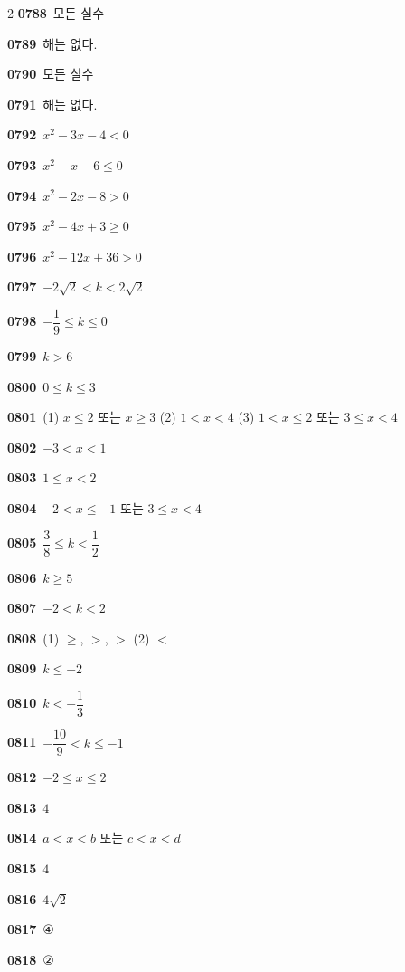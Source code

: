 \documentclass[10pt,a4paper]{article}
\begin{document}
\begin{multicols}{2}
\noindent\textbf{0788}\ 모든 실수\par
\noindent\textbf{0789}\ 해는 없다.\par
\noindent\textbf{0790}\ 모든 실수\par
\noindent\textbf{0791}\ 해는 없다.\par
\noindent\textbf{0792}\ $x^2-3x-4<0$\par
\noindent\textbf{0793}\ $x^2-x-6\le 0$\par
\noindent\textbf{0794}\ $x^2-2x-8>0$\par
\noindent\textbf{0795}\ $x^2-4x+3\ge 0$\par
\noindent\textbf{0796}\ $x^2-12x+36>0$\par
\noindent\textbf{0797}\ $-2\sqrt{2}<k<2\sqrt{2}$\par
\noindent\textbf{0798}\ $-\dfrac{1}{9}\le k\le 0$\par
\noindent\textbf{0799}\ $k>6$\par
\noindent\textbf{0800}\ $0\le k\le 3$\par
\noindent\textbf{0801}\ (1) $x\le 2$ 또는 $x\ge 3$ \quad (2) $1<x<4$ \quad (3) $1<x\le 2$ 또는 $3\le x<4$\par
\noindent\textbf{0802}\ $-3<x<1$\par
\noindent\textbf{0803}\ $1\le x<2$\par
\noindent\textbf{0804}\ $-2<x\le -1$ 또는 $3\le x<4$\par
\noindent\textbf{0805}\ $\dfrac{3}{8}\le k<\dfrac{1}{2}$\par
\noindent\textbf{0806}\ $k\ge 5$\par
\noindent\textbf{0807}\ $-2<k<2$\par
\noindent\textbf{0808}\ (1) $\ge$, $>$, $>$ \quad (2) $<$\par
\noindent\textbf{0809}\ $k\le -2$\par
\noindent\textbf{0810}\ $k<-\dfrac{1}{3}$\par
\noindent\textbf{0811}\ $-\dfrac{10}{9}<k\le -1$\par
\noindent\textbf{0812}\ $-2\le x\le 2$\par
\noindent\textbf{0813}\ $4$\par
\noindent\textbf{0814}\ $a<x<b$ 또는 $c<x<d$\par
\noindent\textbf{0815}\ $4$\par
\noindent\textbf{0816}\ $4\sqrt{2}$\par
\noindent\textbf{0817}\ ④\par
\noindent\textbf{0818}\ ②\par

\end{multicols}
\end{document}
